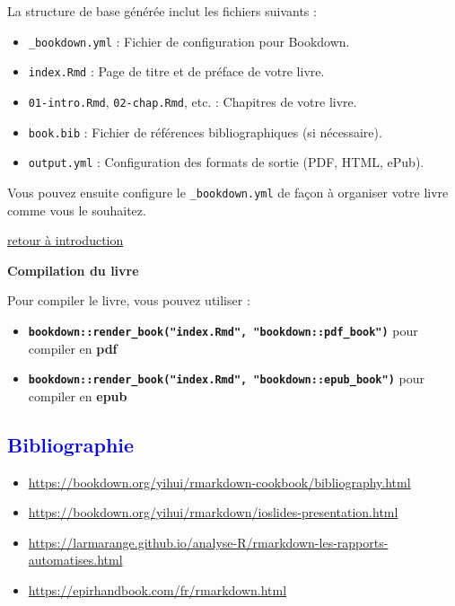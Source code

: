 \documentclass[
  12pt,
]{article}
\providecommand{\tightlist}{%
  \setlength{\itemsep}{0pt}\setlength{\parskip}{0pt}}
\begin{document}
La structure de base générée inclut les fichiers suivants :

\begin{itemize}
\tightlist
\item
  \texttt{\_bookdown.yml} : Fichier de configuration pour Bookdown.
\item
  \texttt{index.Rmd} : Page de titre et de préface de votre livre.
\item
  \texttt{01-intro.Rmd}, \texttt{02-chap.Rmd}, etc. : Chapitres de votre
  livre.
\item
  \texttt{book.bib} : Fichier de références bibliographiques (si
  nécessaire).
\item
  \texttt{output.yml} : Configuration des formats de sortie (PDF, HTML,
  ePub).
\end{itemize}

Vous pouvez ensuite configure le \texttt{\_bookdown.yml} de façon à
organiser votre livre comme vous le souhaitez.

\hyperref[Introduction]{retour à introduction}

\textbf{Compilation du livre}

Pour compiler le livre, vous pouvez utiliser :

\begin{itemize}
\item
  \textbf{\texttt{bookdown::render\_book("index.Rmd",\ "bookdown::pdf\_book")}}
  pour compiler en \textbf{pdf}
\item
  \textbf{\texttt{bookdown::render\_book("index.Rmd",\ "bookdown::epub\_book")}}
  pour compiler en \textbf{epub}
\end{itemize}

\newpage

\textcolor{blue}{\section*{Bibliographie}}

\begin{itemize}
\item
  \url{https://bookdown.org/yihui/rmarkdown-cookbook/bibliography.html}
\item
  \url{https://bookdown.org/yihui/rmarkdown/ioslides-presentation.html}
\item
  \url{https://larmarange.github.io/analyse-R/rmarkdown-les-rapports-automatises.html}
\item
  \url{https://epirhandbook.com/fr/rmarkdown.html}
\end{itemize}


\end{document}
